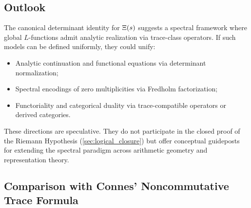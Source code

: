 \subsection*{Outlook}

The canonical determinant identity for \( \Xi(s) \) suggests a spectral framework where global \( L \)-functions admit analytic realization via trace-class operators. If such models can be defined uniformly, they could unify:

\begin{itemize}
  \item Analytic continuation and functional equations via determinant normalization;
  \item Spectral encodings of zero multiplicities via Fredholm factorization;
  \item Functoriality and categorical duality via trace-compatible operators or derived categories.
\end{itemize}

These directions are speculative. They do not participate in the closed proof of the Riemann Hypothesis (\cref{sec:logical_closure}) but offer conceptual guideposts for extending the spectral paradigm across arithmetic geometry and representation theory.

\subsection*{Comparison with Connes’ Noncommutative Trace Formula}

